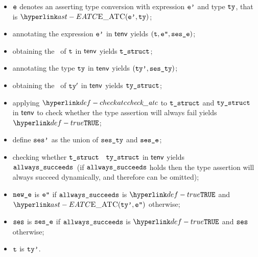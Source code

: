 \ProseParagraph
\AllApply
\begin{itemize}
  \item $\texttt{e}$ denotes an asserting type conversion with expression $\texttt{e'}$ and type $\texttt{ty}$, that is $\EATC(\vep, \tty)$;
  \item annotating the expression $\texttt{e'}$ in $\textsf{tenv}$ yields $(\texttt{t}, \texttt{e''}, \texttt{ses\_e})$\ProseOrTypeError;
  \item obtaining the \structure\ of $\texttt{t}$ in $\textsf{tenv}$ yields $\texttt{t\_struct}$\ProseOrTypeError;
  \item annotating the type $\texttt{ty}$ in $\textsf{tenv}$ yields $(\texttt{ty'}, \texttt{ses\_ty})$\ProseOrTypeError;
  \item obtaining the \structure\ of $\texttt{ty}'$ in $\textsf{tenv}$ yields $\texttt{ty\_struct}$\ProseOrTypeError;
  \item applying $\checkatc$ to $\texttt{t\_struct}$ and $\texttt{ty\_struct}$ in $\textsf{tenv}$ to check whether the type assertion
        will always fail yields $\True$\ProseOrTypeError;
  \item define $\texttt{ses'}$ as the union of $\texttt{ses\_ty}$ and $\texttt{ses\_e}$;
  \item checking whether $\texttt{t\_struct}$ \subtypesatisfies\ $\texttt{ty\_struct}$ in $\textsf{tenv}$ yields \\
        $\texttt{allways\_succeeds}$\ProseOrTypeError\
        (if $\texttt{allways\_succeeds}$ holds then the type assertion will always succeed dynamically, and therefore can be omitted);
  \item $\texttt{new\_e}$ is $\texttt{e''}$ if $\texttt{allways\_succeeds}$ is $\True$ and $\EATC(\ttyp, \vepp)$ otherwise;
  \item $\texttt{ses}$ is $\texttt{ses\_e}$ if $\texttt{allways\_succeeds}$ is $\True$ and $\texttt{ses}$ otherwise;
  \item $\texttt{t}$ is $\texttt{ty'}$.
\end{itemize}

